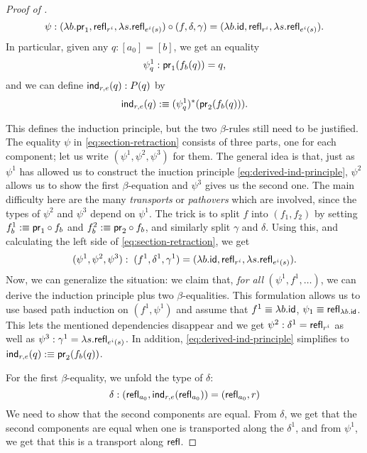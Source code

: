 \begin{proof}[Proof of ]
 \begin{equation} \label{eq:section-retraction}
  \psi: (\lambda b. \mathsf{pr}_1,\mathsf{refl}_{r^i},\lambda s. \mathsf{refl}_{e^i(s)}) \circ (f, \delta, \gamma)
   = (\lambda b. \mathsf{id}, \mathsf{refl}_{r^i}, \lambda s. \mathsf{refl}_{e^i(s)}) \text{.}
 \end{equation}
In particular, given any $q : [a_0] = [b]$, we get an equality
 \begin{equation} \label{eq:proj1-f}
  \psi^1_q : \mathsf{pr}_1(f_b(q)) = q \text{,}
 \end{equation}
and we can define $\mathsf{ind}_{r,e}(q) : P(q)$ by
 \begin{equation}
  \mathsf{ind}_{r,e}(q) :\equiv (\psi^1_q)^*(\mathsf{pr}_2(f_b(q))). \label{eq:derived-ind-principle}
 \end{equation}

This defines the induction principle, but the two $\beta$-rules still need to
be justified.
The equality $\psi$ in \eqref{eq:section-retraction} consists of three parts,
one for each component;
let us write $(\psi^1, \psi^2, \psi^3)$ for them.
The general idea is that, just as $\psi^1$ has allowed us to construct
the inuction principle \eqref{eq:derived-ind-principle},
$\psi^2$ allows us to show the first $\beta$-equation and $\psi^3$ gives us the
second one.
The main difficulty here are the many \emph{transports} or \emph{pathovers}
which are involved, since the types of $\psi^2$ and $\psi^3$ depend on $\psi^1$.
The trick is to split $f$ into $(f_1, f_2)$ by setting $f_b^1 :\equiv \mathsf{pr}_1 \circ f_b$
and $f_b^2 :\equiv \mathsf{pr}_2 \circ f_b$, and similarly split $\gamma$ and $\delta$.
Using this, and calculating the left side of \eqref{eq:section-retraction}, we get
 \begin{equation*}
  (\psi^1, \psi^2, \psi^3) : \; (f^1, \delta^1, \gamma^1) = (\lambda b. \mathsf{id}, \mathsf{refl}_{r^i}, \lambda s. \mathsf{refl}_{e^i(s)}) \text{.}
 \end{equation*}
 Now, we can generalize the situation: we claim that, \emph{for all} $(\psi^1, f^1, \ldots)$,
 we can derive the induction principle plus two $\beta$-equalities.
 This formulation allows us to use based path induction on $(f^1, \psi^1)$ and
 assume that $f^1 \equiv \lambda b.\mathsf{id}$, $\psi_1 \equiv \mathsf{refl}_{\lambda b.\mathsf{id}}$.
 This lets the mentioned dependencies disappear and we get $\psi^2 : \delta^1 = \mathsf{refl}_{r^i}$ 
 as well as $\psi^3 : \gamma^1 = \lambda s.\mathsf{refl}_{e^i(s)}$.
 In addition, \eqref{eq:derived-ind-principle} simplifies to $\mathsf{ind}_{r,e}(q) :\equiv \mathsf{pr}_2(f_b(q))$.

 For the first $\beta$-equality, we unfold the type of $\delta$:
 \begin{equation*}
  \delta : (\mathsf{refl}_{a_0}, \mathsf{ind}_{r,e}(\mathsf{refl}_{a_0})) = (\mathsf{refl}_{a_0}, r)
 \end{equation*}
 We need to show that the second components are equal.
 From $\delta$, we get that the second components are equal when one is
 transported along the $\delta^1$,
 and from $\psi^1$, we get that this is a transport along $\mathsf{refl}$.



\end{proof}
